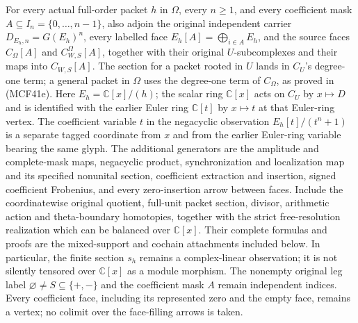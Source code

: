 For every actual full-order packet $h$ in $\Omega$, every $n\geq1$, and every
coefficient mask $A\subseteq I_n=\{0,\ldots,n-1\}$, also adjoin
the original independent carrier $D_{E_h,n}=G(E_h)^n$, every labelled
face $E_h[A]=\bigoplus_{i\in A}E_h$, and the source faces
$C_\Omega[A]$ and $C_{W,S}^{\Omega}[A]$, together with their
original $U$-subcomplexes and their maps into $C_{W,S}[A]$.
The section for a packet rooted in $U$ lands in $C_U$'s
degree-one term; a general packet in $\Omega$ uses the
degree-one term of $C_\Omega$, as proved in (MCF41e).
Here $E_h=\mathbb C[x]/(h)$;
the scalar ring $\mathbb C[x]$ acts on $C_U$ by $x\mapsto D$
and is identified with the earlier Euler ring $\mathbb C[t]$
by $x\mapsto t$ at that Euler-ring vertex.
The coefficient variable $t$ in the negacyclic observation
$E_h[t]/(t^n+1)$ is a separate tagged coordinate from $x$ and
from the earlier Euler-ring variable bearing the same glyph.
The additional generators are the amplitude and complete-mask maps,
negacyclic product, synchronization and localization map and its
specified nonunital section, coefficient extraction and insertion,
signed coefficient Frobenius, and every zero-insertion arrow between
faces. Include the coordinatewise original quotient, full-unit
packet section, divisor, arithmetic action and theta-boundary
homotopies, together with the strict free-resolution realization
which can be balanced over $\mathbb C[x]$.
Their complete formulas and proofs are the mixed-support and
cochain attachments included below. In particular, the finite
section $s_h$ remains a complex-linear observation; it is not
silently tensored over $\mathbb C[x]$ as a module morphism.
The nonempty original leg label $\varnothing\ne S\subseteq\{+,-\}$ and the coefficient
mask $A$ remain independent indices. Every coefficient face,
including its represented zero and the empty face, remains a
vertex; no colimit over the face-filling arrows is taken.

